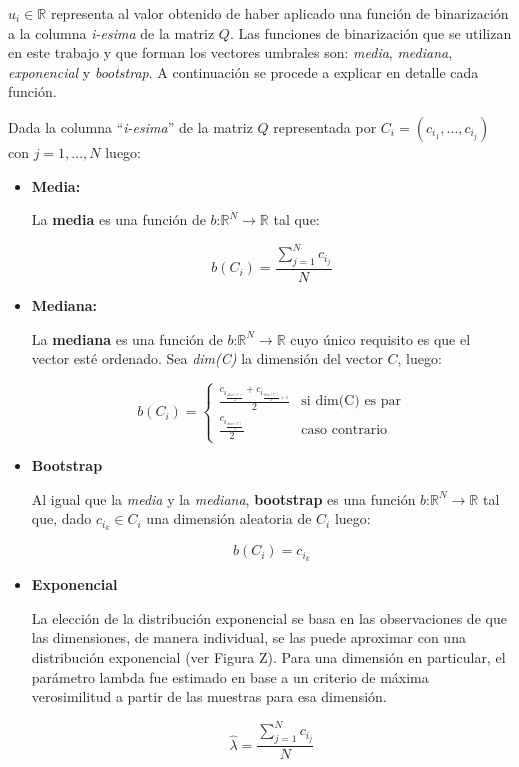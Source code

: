 	$u_{i} \in \mathbb{R}$ representa al valor obtenido de haber aplicado una función de binarización a la columna \textit{i-esima} de la matriz  $Q$. Las funciones de binarización que se utilizan en este trabajo y que forman los vectores umbrales son: \textit{media}, \textit{mediana}, \textit{exponencial} y \textit{bootstrap}. A continuación se procede a explicar en detalle cada función.
	
	Dada la columna ``\textit{i-esima}'' de la matriz $Q$ representada por $C_i = (c_{i_1}, \dots, c_{i_j})$ con $j=1, \dots, N$ luego:

	\begin{itemize}
	
	\item \textbf{Media:}
	
	La \textbf{media} es una función de $\textit{b:}\mathbb{R}^{N} \rightarrow \mathbb{R}$ tal que:
	
	$$b(C_i) = \frac{\sum_{j=1}^N c_{i_j}}{N} $$

	\item \textbf{Mediana:}
	
	La \textbf{mediana} es una función de $\textit{b:}\mathbb{R}^{N} \rightarrow \mathbb{R}$ cuyo único requisito es que el vector esté ordenado. Sea \textit{dim(C)} la dimensión del vector $C$, luego:
	
	\[
    		b(C_i) = 
		\begin{cases}
    			\frac{c_{i_{\frac{dim(C)}{2}}} + c_{i_{\frac{dim(C)}{2}+1}}}{2} & \text{si dim(C) es par}\\
    			\frac{c_{i_{\frac{dim(C)}{2}}}}{2} & \text{caso contrario}
		\end{cases}
	\]
	
	\item \textbf{Bootstrap}
	
	Al igual que la \textit{media} y la \textit{mediana}, \textbf{bootstrap} es una función $\textit{b:}\mathbb{R}^{N} \rightarrow \mathbb{R}$ tal que, dado $c_{i_k} \in C_{i}$ una dimensión aleatoria de $C_{i}$ luego:
	
	$$ b(C_i) = c_{i_k} $$

	\item \textbf{Exponencial}
	
	La elección de la distribución exponencial se basa en las observaciones de que las dimensiones, de manera individual, se las puede aproximar con una distribución exponencial (ver Figura Z). Para una dimensión en particular, el parámetro lambda fue estimado en base a un criterio de máxima verosimilitud a partir de las muestras para esa dimensión.
	
	$$\hat{\lambda} = \frac{\sum_{j=1}^N c_{i_j}}{N} $$
	
	\end{itemize}

	